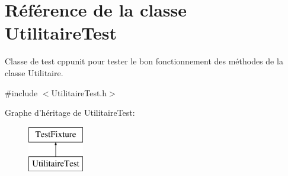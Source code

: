 \hypertarget{class_utilitaire_test}{\section{Référence de la classe Utilitaire\-Test}
\label{class_utilitaire_test}
}


Classe de test cppunit pour tester le bon fonctionnement des méthodes de la classe Utilitaire.  




{\ttfamily \#include $<$Utilitaire\-Test.\-h$>$}

Graphe d'héritage de Utilitaire\-Test\-:\begin{figure}[H]
\begin{center}
\leavevmode
\includegraphics[height=2.000000cm]{class_utilitaire_test}
\end{center}
\end{figure}
